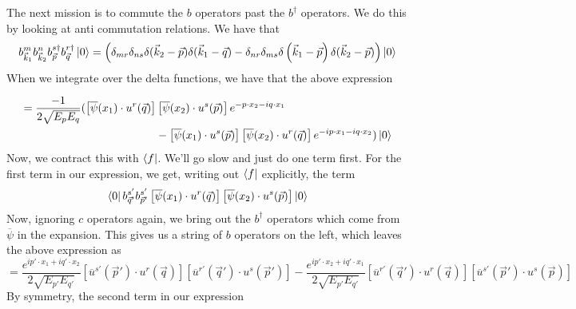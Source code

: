 The next mission is to commute the $ b $ operators 
past the $ b ^ \dagger $ operators.  We do this 
by looking at anti commutation relations. 
We have that 
\begin{align*}
b_{\vec{k} _  1 } ^ m b _{ \vec{k} _ 2 } ^ n b _{ \vec{p} } ^{ s \dagger } b _{ \vec{q} } ^{ r \dagger  } \ket{ 0 } 
&=  \left( \delta_{ mr } \delta _{ n s} \delta ( \vec{k} _ 2 - \vec{p} ) \delta (\vec{k} _1  - \vec{q} ) 
- \delta _{ nr  } \delta _{ ms  } \delta \left( \vec{k} _ 1 - \vec{p}  \right)  \delta ( \vec{k} _2  - \vec{p} ) \right) \ket{ 0 }   \\
\end{align*}
When we integrate over the delta functions, 
we have that the above expression 

\begin{align*}
= \frac{ - 1 }{2 \sqrt{ E_{ p }  E_{ q }  }  } ( \left[ \overline{ \psi } ( x_1 ) \cdot  u ^ r ( \vec{q} )  \right] &  
\left[  \overline{ \psi } ( x_2 ) \cdot  u ^ s ( \vec{p} )  \right]  e ^{  - p \cdot  x_2 - i q \cdot  x_1 } \\
												    &  - \left[  \overline{\psi } ( x_1 ) \cdot  u ^ s ( \vec{p} )  \right]  \left[  \overline{ \psi } ( x_2 ) \cdot  u ^ r ( \vec{q} )  \right]  e ^{  -i p \cdot  x_1  - i q \cdot  x_2 } ) \ket{ 0 } 
\end{align*}
Now, we contract this with $ \bra { f } $. We'll go slow 
and just do one term first. For the first term 
in our expression, we get, writing out $ \bra{ f} $ explicitly, 
the term 
\[
\bra{ 0 } b _{ \vec{q} ' }^{ s ' } b _{ \vec{p}' } ^{ s ' } 
\left[  \overline{ \psi } ( x_1 ) \cdot  u ^ r ( \vec{q} )  \right]  \left[  \overline{ \psi } ( x_2 ) \cdot  u ^ s ( \vec{p} )  \right] \ket{ 0 } 
\] Now, ignoring $ c $ operators again, we bring out the $ b ^\dagger $  operators 
which come from $ \overline{ \psi } $ in the expansion. 
This gives us a string of $ b $ operators on the left, which leaves
the above expression as 
\[
= \frac{ e ^{ i p ' \cdot  x_1 + i q ' \cdot  x_2  } }{ 2 \sqrt{ E_{ p'  }  E_{ q ' } } } \left[ 
\overline{ u }^{ s ' } ( \vec{p} ' ) \cdot  u ^{ r } ( \vec{q} ) \right]  \left[  
\overline{ u } ^{ r ' } \left(  \vec{q} '  \right)  \cdot  u ^{ s } ( \vec{p} ' ) \right]  
- \frac{ e ^{ i p ' \cdot  x_2 + i q' \cdot  x_1 } }{2 \sqrt{ E_{ p' }  E_{ q' }  }  } \left[  
\overline{ u } ^{ r'} \left(  \vec{q} '  \right)  \cdot  u ^ r \left( \vec{q}  \right)  \right]  
\left[  \overline{ u } ^{ s ' } \left( \vec{p} '  \right)  \cdot  u ^ s ( \vec{p} )  \right]  
\] By symmetry, the second term in our expression 
